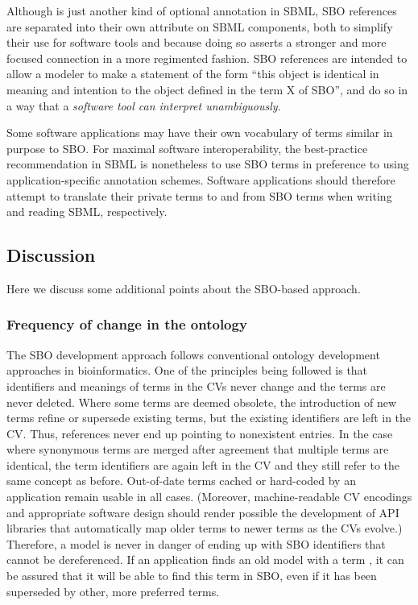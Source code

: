 Although  is just another kind of optional
annotation in SBML, SBO references are separated into
their own attribute on SBML components, both to simplify their use
for software tools and because doing so asserts a stronger and
more focused connection in a more regimented fashion.  SBO
references are intended to allow a modeler to make a statement of
the form ``this object is identical in meaning and intention to
the object defined in the term X of SBO'', and do so in a way
that a \emph{software tool can interpret unambiguously}.

Some software applications may have their own vocabulary of terms
similar in purpose to SBO.  For maximal software interoperability,
the best-practice recommendation in SBML is nonetheless to use SBO
terms in preference to using application-specific annotation
schemes.  Software applications should therefore attempt to
translate their private terms to and from SBO terms when writing
and reading SBML, respectively.


\subsection{Discussion}

Here we discuss some additional points about the SBO-based
approach.

\subsubsection{Frequency of change in the ontology}
\label{sec:sbo-frequency-of-change}

The SBO development approach follows conventional ontology
development approaches in bioinformatics.  One of the principles
being followed is that identifiers and meanings of terms in the
CVs never change and the terms are never deleted.  Where some
terms are deemed obsolete, the introduction of new terms refine or
supersede existing terms, but the existing identifiers are left in
the CV.  Thus, references never end up pointing to nonexistent
entries.  In the case where synonymous terms are merged after
agreement that multiple terms are identical, the term identifiers
are again left in the CV and they still refer to the same concept
as before.  Out-of-date terms cached or hard-coded by an
application remain usable in all cases.  (Moreover,
machine-readable CV encodings and appropriate software design
should render possible the development of API libraries that
automatically map older terms to newer terms as the CVs evolve.)
Therefore, a model is never in danger of ending up with SBO
identifiers that cannot be dereferenced.  If an application finds
an old model with a term , it can be assured
that it will be able to find this term in SBO, even if it has been
superseded by other, more preferred terms.



